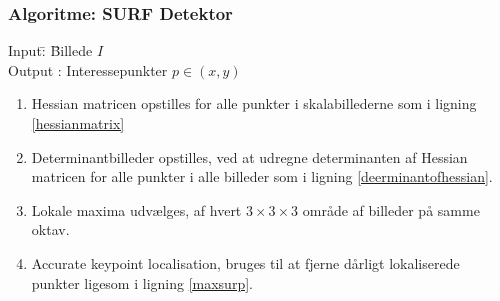 \subsubsection*{Algoritme: SURF Detektor}
\begin{tabbing}
Input\quad \= : \= Billede $I$\\
Output \text{ } \> : \> Interessepunkter $p \in (x,y)$
\end{tabbing}
\begin{enumerate}
\item {Hessian matricen opstilles for alle punkter i skalabillederne som i ligning \eqref{hessianmatrix}}
\item Determinantbilleder opstilles, ved at udregne determinanten af Hessian matricen for alle punkter i alle billeder som i ligning \eqref{deerminantofhessian}.
\item Lokale maxima udvælges, af hvert $3\times3\times3$ område af billeder på samme oktav.
\item Accurate keypoint localisation, bruges til at fjerne dårligt lokaliserede punkter ligesom i ligning \eqref{maxsurp}.
\end{enumerate}